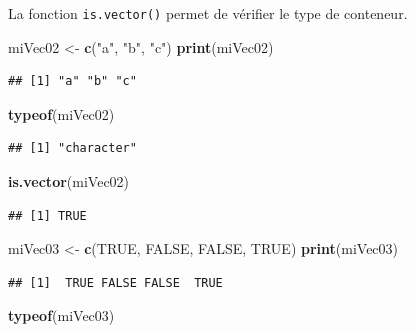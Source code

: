 \documentclass[twoside,symmetric]{book}
\newenvironment{Shaded}{}{}
\newcommand{\KeywordTok}[1]{\textbf{#1}}
\newcommand{\NormalTok}[1]{#1}
\newcommand{\OtherTok}[1]{#1}
\newcommand{\StringTok}[1]{#1}
\begin{document}
La fonction \texttt{is.vector()} permet de vérifier le type de conteneur.

\begin{Shaded}
\begin{Highlighting}[]
\NormalTok{miVec02 <-}\StringTok{ }\KeywordTok{c}\NormalTok{(}\StringTok{"a"}\NormalTok{, }\StringTok{"b"}\NormalTok{, }\StringTok{"c"}\NormalTok{) }
\KeywordTok{print}\NormalTok{(miVec02)}
\end{Highlighting}
\end{Shaded}

\begin{verbatim}
## [1] "a" "b" "c"
\end{verbatim}

\begin{Shaded}
\begin{Highlighting}[]
\KeywordTok{typeof}\NormalTok{(miVec02)}
\end{Highlighting}
\end{Shaded}

\begin{verbatim}
## [1] "character"
\end{verbatim}

\begin{Shaded}
\begin{Highlighting}[]
\KeywordTok{is.vector}\NormalTok{(miVec02)}
\end{Highlighting}
\end{Shaded}

\begin{verbatim}
## [1] TRUE
\end{verbatim}

\begin{Shaded}
\begin{Highlighting}[]
\NormalTok{miVec03 <-}\StringTok{ }\KeywordTok{c}\NormalTok{(}\OtherTok{TRUE}\NormalTok{, }\OtherTok{FALSE}\NormalTok{, }\OtherTok{FALSE}\NormalTok{, }\OtherTok{TRUE}\NormalTok{)}
\KeywordTok{print}\NormalTok{(miVec03)}
\end{Highlighting}
\end{Shaded}

\begin{verbatim}
## [1]  TRUE FALSE FALSE  TRUE
\end{verbatim}

\begin{Shaded}
\begin{Highlighting}[]
\KeywordTok{typeof}\NormalTok{(miVec03)}
\end{Highlighting}
\end{Shaded}
\end{document}
